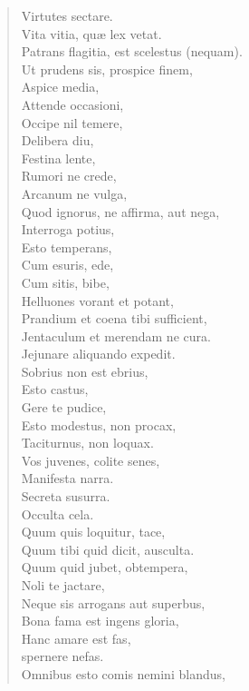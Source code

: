 \documentclass[12pt,  postvopaper]{memoir}
\begin{document}
\begin{verse}

  Virtutes sectare.\\
  Vita vitia, quæ lex vetat.\\
  Patrans flagitia, est scelestus (nequam).\\
  Ut prudens sis, prospice finem,\\
  Aspice media,\\
  Attende occasioni,\\
  Occipe nil temere,\\
  Delibera diu,\\
  Festina lente,\\
  Rumori ne crede,\\
  Arcanum ne vulga,\\
  Quod ignorus, ne affirma, aut nega,\\
  Interroga potius,\\
  Esto temperans,\\
  Cum esuris, ede,\\
  Cum sitis, bibe,\\
  Helluones vorant et potant,\\
  Prandium et coena tibi sufficient,\\
  Jentaculum et merendam ne cura.\\
  Jejunare aliquando expedit.\\
  Sobrius non est ebrius,\\
  Esto castus,\\
  Gere te pudice,\\
  Esto modestus, non procax,\\
  Taciturnus, non loquax.\\
  Vos juvenes, colite senes,\\
  Manifesta narra.\\
  Secreta susurra.\\
  Occulta cela.\\
  Quum quis loquitur, tace,\\
  Quum tibi quid dicit, ausculta.\\
  Quum quid jubet, obtempera,\\
  Noli te jactare,\\
  Neque sis arrogans aut superbus,\\
  Bona fama est ingens gloria,\\
  Hanc amare est fas,\\
  spernere nefas.\\
  Omnibus esto comis nemini blandus,\\

\end{verse}
\end{document}
